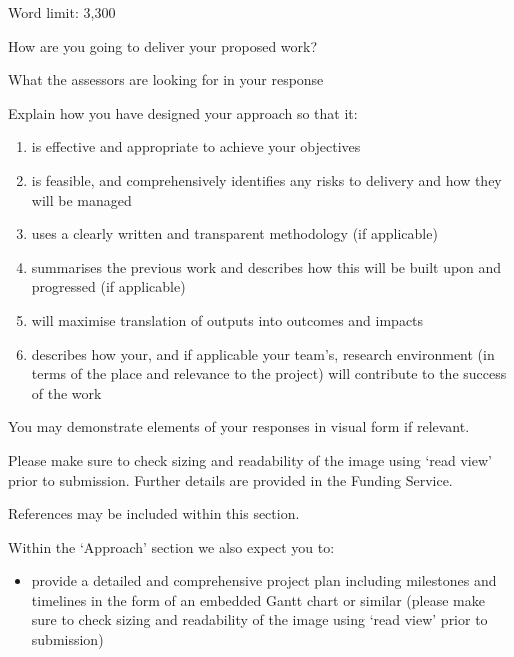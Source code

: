 
\begin{instruction}

Word limit: 3,300

How are you going to deliver your proposed work?

What the assessors are looking for in your response

Explain how you have designed your approach so that it:

\begin{enumerate}

    \item is effective and appropriate to achieve your objectives

    \item is feasible, and comprehensively identifies any risks to delivery and
    how they will be managed

    \item uses a clearly written and transparent methodology (if applicable)

    \item summarises the previous work and describes how this will be built
    upon and progressed (if applicable)

    \item will maximise translation of outputs into outcomes and impacts

    \item describes how your, and if applicable your team’s, research
    environment (in terms of the place and relevance to the project) will
    contribute to the success of the work

\end{enumerate}

You may demonstrate elements of your responses in visual form if relevant.

Please make sure to check sizing and readability of the image using ‘read view’
prior to submission. Further details are provided in the Funding Service.

References may be included within this section.

Within the ‘Approach’ section we also expect you to:

\begin{itemize}

    \item provide a detailed and comprehensive project plan including
    milestones and timelines in the form of an embedded Gantt chart or similar
    (please make sure to check sizing and readability of the image using ‘read
    view’ prior to submission)


\end{itemize}
\end{instruction}
